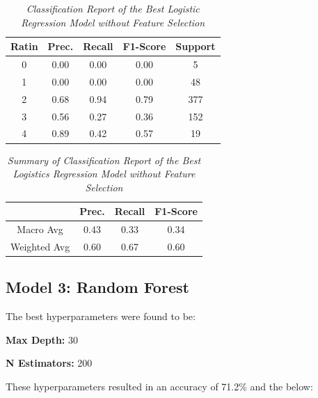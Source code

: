 \documentclass[11pt]{article}
\begin{document}
\begin{table}[!ht]
    \begin{center}
        \begin{tabular}{c|c|c|c|c}			
            \hline
            Ratin & Prec. & Recall & F1-Score & Support \\
            \hline\hline
            0 & 0.00 & 0.00 & 0.00 & 5 \\
            1 & 0.00 & 0.00 & 0.00 & 48 \\
            2 & 0.68 & 0.94 & 0.79 & 377 \\
            3 & 0.56 & 0.27 & 0.36 & 152 \\
            4 & 0.89 & 0.42 & 0.57 & 19\\
                \hline
        \end{tabular}

        \caption{\textit{Classification Report of the Best Logistic Regression Model without Feature Selection}}
        \label{logr-ft-report}

    \end{center}
\end{table}
\begin{table}[!ht]
    \begin{center}
        \begin{tabular}{c||c|c|c}			
            \hline
             & Prec. & Recall & F1-Score \\
            \hline\hline
            Macro Avg & 0.43 & 0.33 & 0.34 \\
            Weighted Avg & 0.60 & 0.67 & 0.60 \\
                \hline
        \end{tabular}

        \caption{\textit{Summary of Classification Report of the Best Logistics Regression Model without Feature Selection}}
        \label{logr-ft-report-sum}

    \end{center}
\end{table}

\subsection{Model 3: Random Forest}
The best hyperparameters were found to be:

\textbf{Max Depth: } 30

\textbf{N Estimators: } 200

\noindent
These hyperparameters resulted in an accuracy of 71.2\% and the below:
\end{document}

